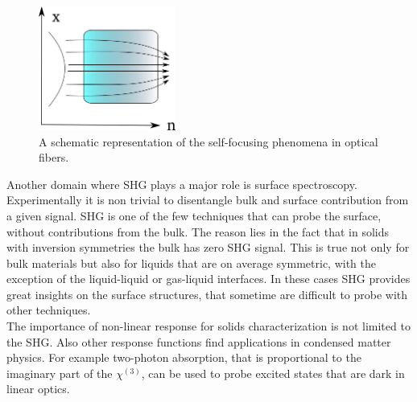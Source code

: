 \begin{figure}
 \vspace{-0.8cm}
\begin{center}
\includegraphics[width=0.4\textwidth]{Figures/selffocus}
\end{center}
\vspace{-0.5cm}
\caption{A schematic representation of the self-focusing phenomena in optical fibers. \label{selffocusing}}
\end{figure}           
Another domain where SHG plays a major role is surface spectroscopy. Experimentally it is non trivial to disentangle bulk and surface contribution from a given signal. SHG is one of the few techniques that can probe the surface, without contributions from the bulk. The reason lies in the fact that in solids with inversion symmetries the bulk has zero SHG signal. This is true not only for bulk materials but also for liquids that are on average symmetric, with the exception of the liquid-liquid or gas-liquid interfaces. In these cases SHG provides great insights on the surface structures, that sometime are difficult to probe with other techniques.\cite{eisenthal1996liquid} \\ 
The importance of non-linear response for solids characterization is not limited to the SHG. Also other response functions find applications in condensed matter physics. For example two-photon absorption, that is proportional to the imaginary part of the $\chi^{(3)}$, can be used to probe excited states that are dark in linear optics.\cite{wang2005optical,cassabois2015hexagonal}\\ 

